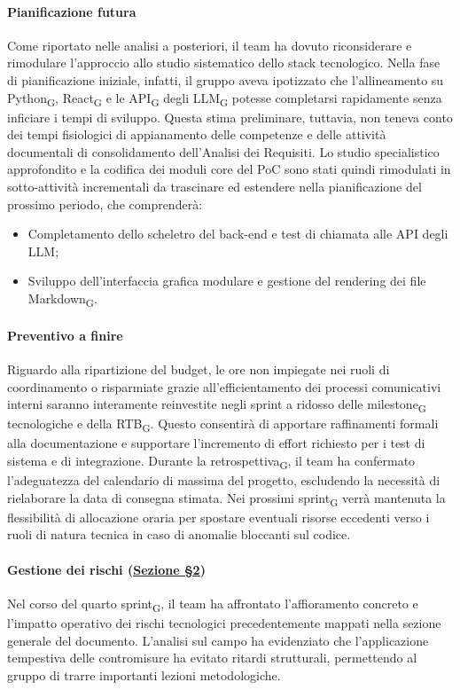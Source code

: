 \documentclass[a4paper, 10pt, colorlinks=true, linkcolor=black, urlcolor=blue, citecolor=blue, hidelinks]{article}
\begin{document}
\paragraph{Pianificazione futura}
Come riportato nelle analisi a posteriori, il team ha dovuto riconsiderare e rimodulare l'approccio allo studio sistematico dello stack tecnologico. Nella fase di pianificazione iniziale, infatti, il gruppo aveva ipotizzato che l'allineamento su Python\textsubscript{G}, React\textsubscript{G} e le API\textsubscript{G} degli LLM\textsubscript{G} potesse completarsi rapidamente senza inficiare i tempi di sviluppo. Questa stima preliminare, tuttavia, non teneva conto dei tempi fisiologici di appianamento delle competenze e delle attività documentali di consolidamento dell'Analisi dei Requisiti. Lo studio specialistico approfondito e la codifica dei moduli core del PoC sono stati quindi rimodulati in sotto-attività incrementali da trascinare ed estendere nella pianificazione del prossimo periodo, che comprenderà:
\begin{itemize}
    \item Completamento dello scheletro del back-end e test di chiamata alle API degli LLM;
    \item Sviluppo dell'interfaccia grafica modulare e gestione del rendering dei file Markdown\textsubscript{G}.
\end{itemize}

\paragraph{Preventivo a finire}
Riguardo alla ripartizione del budget, le ore non impiegate nei ruoli di coordinamento o risparmiate grazie all'efficientamento dei processi comunicativi interni saranno interamente reinvestite negli sprint a ridosso delle milestone\textsubscript{G} tecnologiche e della RTB\textsubscript{G}. Questo consentirà di apportare raffinamenti formali alla documentazione e supportare l'incremento di effort richiesto per i test di sistema e di integrazione. Durante la retrospettiva\textsubscript{G}, il team ha confermato l'adeguatezza del calendario di massima del progetto, escludendo la necessità di rielaborare la data di consegna stimata. Nei prossimi sprint\textsubscript{G} verrà mantenuta la flessibilità di allocazione oraria per spostare eventuali risorse eccedenti verso i ruoli di natura tecnica in caso di anomalie bloccanti sul codice.

\paragraph{Gestione dei rischi (\hyperref[tab:gestione-rischi]{Sezione \S2})}
Nel corso del quarto sprint\textsubscript{G}, il team ha affrontato l'affioramento concreto e l'impatto operativo dei rischi tecnologici precedentemente mappati nella sezione generale del documento. L'analisi sul campo ha evidenziato che l'applicazione tempestiva delle contromisure ha evitato ritardi strutturali, permettendo al gruppo di trarre importanti lezioni metodologiche.
\end{document}

